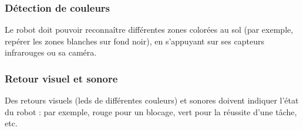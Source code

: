 \subsubsection{Détection de couleurs}
Le robot doit pouvoir reconnaître différentes zones colorées au sol (par exemple, repérer les zones blanches sur fond noir), en s’appuyant sur ses capteurs infrarouges ou sa caméra.

\subsubsection{Retour visuel et sonore}
Des retours visuels (\acrshort{led}s de différentes couleurs) et sonores doivent indiquer l’état du robot : par exemple, rouge pour un blocage, vert pour la réussite d’une tâche, etc.
